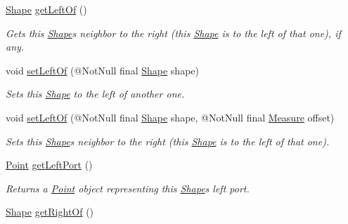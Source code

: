 \begin{DoxyCompactItemize}
\hyperlink{classcom_1_1aarrelaakso_1_1drawl_1_1_shape}{Shape} \hyperlink{classcom_1_1aarrelaakso_1_1drawl_1_1_shape_a2b19d5964ac46d545a7bae3133df6532}{get\+Left\+Of} ()
\begin{DoxyCompactList}\small\item\em Gets this \hyperlink{classcom_1_1aarrelaakso_1_1drawl_1_1_shape}{Shape}\textquotesingle{}s neighbor to the right (this \hyperlink{classcom_1_1aarrelaakso_1_1drawl_1_1_shape}{Shape} is to the left of that one), if any. \end{DoxyCompactList}\item 
void \hyperlink{classcom_1_1aarrelaakso_1_1drawl_1_1_shape_a0aef56392d76202235a9520394e87492}{set\+Left\+Of} (@Not\+Null final \hyperlink{classcom_1_1aarrelaakso_1_1drawl_1_1_shape}{Shape} shape)
\begin{DoxyCompactList}\small\item\em Sets this \hyperlink{classcom_1_1aarrelaakso_1_1drawl_1_1_shape}{Shape} to the left of another one. \end{DoxyCompactList}\item 
void \hyperlink{classcom_1_1aarrelaakso_1_1drawl_1_1_shape_a8012a3823982d77b563ef61787ccb523}{set\+Left\+Of} (@Not\+Null final \hyperlink{classcom_1_1aarrelaakso_1_1drawl_1_1_shape}{Shape} shape, @Not\+Null final \hyperlink{classcom_1_1aarrelaakso_1_1drawl_1_1_measure}{Measure} offset)
\begin{DoxyCompactList}\small\item\em Sets this \hyperlink{classcom_1_1aarrelaakso_1_1drawl_1_1_shape}{Shape}\textquotesingle{}s neighbor to the right (this \hyperlink{classcom_1_1aarrelaakso_1_1drawl_1_1_shape}{Shape} is to the left of that one). \end{DoxyCompactList}\item 
\hyperlink{classcom_1_1aarrelaakso_1_1drawl_1_1_point}{Point} \hyperlink{classcom_1_1aarrelaakso_1_1drawl_1_1_shape_aeffa96786ca552adf46924ec77da9555}{get\+Left\+Port} ()
\begin{DoxyCompactList}\small\item\em Returns a \hyperlink{classcom_1_1aarrelaakso_1_1drawl_1_1_point}{Point} object representing this \hyperlink{classcom_1_1aarrelaakso_1_1drawl_1_1_shape}{Shape}\textquotesingle{}s left port. \end{DoxyCompactList}\item 
\hyperlink{classcom_1_1aarrelaakso_1_1drawl_1_1_shape}{Shape} \hyperlink{classcom_1_1aarrelaakso_1_1drawl_1_1_shape_a1ad573b06f341aa79f6a255a476ae6e4}{get\+Right\+Of} ()

\end{DoxyCompactItemize}
